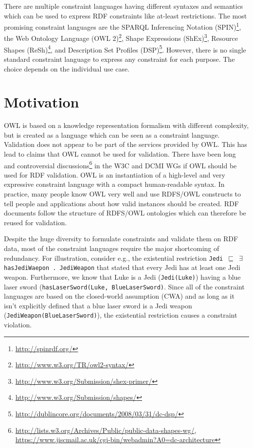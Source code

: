 \documentclass{llncs}
\newcommand{\ms}[1]{\texttt{#1}}
\begin{document}
There are multiple constraint languages having different syntaxes and semantics which can be used to express RDF constraints like at-least restrictions.
The most promising constraint languages are 
the SPARQL Inferencing Notation (SPIN)\footnote{\url{http://spinrdf.org/}}, 
the Web Ontology Language (OWL 2)\footnote{\url{http://www.w3.org/TR/owl2-syntax/}}, 
Shape Expressions (ShEx)\footnote{\url{http://www.w3.org/Submission/shex-primer/}}, 
Resource Shapes (ReSh)\footnote{\url{http://www.w3.org/Submission/shapes/}}, 
and Description Set Profiles (DSP)\footnote{\url{http://dublincore.org/documents/2008/03/31/dc-dsp/}}.
However, there is no single standard constraint language to express any constraint for each purpose.
The choice depends on the individual use case.

\section{Motivation}

OWL is based on a knowledge representation formalism with different complexity, but is created as a language which can be seen as a constraint language.
Validation does not appear to be part of the services provided by OWL.  
This has lead to claims that OWL cannot be used for validation. 
There have been long and controversial discussions\footnote{\url{http://lists.w3.org/Archives/Public/public-data-shapes-wg/}, \url{https://www.jiscmail.ac.uk/cgi-bin/webadmin?A0=dc-architecture}} in the W3C and DCMI WGs if OWL should be used for RDF validation.
OWL is an instantiation of a high-level and very expressive constraint language with a compact human-readable syntax.
In practice, many people know OWL very well and use RDFS/OWL constructs to tell people and applications about how valid instances should be created.
RDF documents follow the structure of RDFS/OWL ontologies which can therefore be reused for validation.

Despite the huge diversity to formulate constraints and validate them on RDF data, most of the constraint languages require the major shortcoming of redundancy. For illustration, consider e.g., the existential restriction \ms{Jedi $\sqsubseteq$ $\exists$ hasJediWaepon . JediWeapon} that stated that every Jedi has at least one Jedi weapon. Furthermore, we know that Luke is a Jedi (\ms{Jedi(Luke)}) having a blue laser sword (\ms{hasLaserSword(Luke, BlueLaserSword)}. Since all of the constraint languages are based on the closed-world assumption (CWA) and as long as it isn't explicitly defined that a blue laser sword is a Jedi weapon (\ms{JediWeapon(BlueLaserSword)}), the existential restriction causes a constraint violation.
\end{document}
